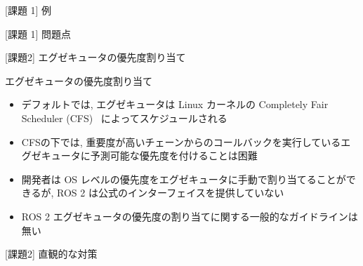 \begin{frame}{[課題 1] 例}
\end{frame}

\begin{frame}{[課題 1] 問題点}
\end{frame}

\begin{frame}{[課題2] エグゼキュータの優先度割り当て}
    \begin{block}{エグゼキュータの優先度割り当て}
      \setlength{\linewidth}{0.98\columnwidth}
      \begin{itemize}
        \item デフォルトでは, エグゼキュータは Linux カーネルの Completely Fair Scheduler (CFS)~\cite{wong2008fairness} によってスケジュールされる
        \item CFSの下では, 重要度が高いチェーンからのコールバックを実行しているエグゼキュータに予測可能な優先度を付けることは困難
        \item 開発者は OS レベルの優先度をエグゼキュータに手動で割り当てることができるが, ROS 2 は公式のインターフェイスを提供していない
        \item ROS 2 エグゼキュータの優先度の割り当てに関する一般的なガイドラインは無い
      \end{itemize}
    \end{block}
\end{frame}

\begin{frame}{[課題2] 直観的な対策}
\end{frame}

